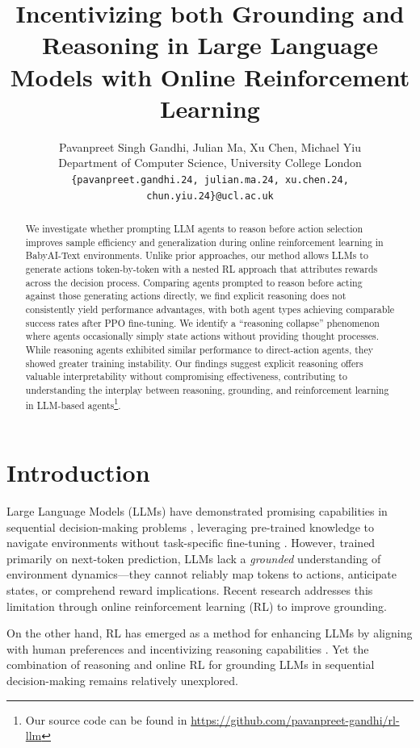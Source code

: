 \documentclass[11pt,a4paper]{article}
\title{Incentivizing both Grounding and Reasoning in Large Language Models with Online Reinforcement Learning}
\author{
  Pavanpreet Singh Gandhi, Julian Ma, Xu Chen, Michael Yiu \\
  Department of Computer Science, University College London \\
  \texttt{\{pavanpreet.gandhi.24, julian.ma.24, xu.chen.24, chun.yiu.24\}@ucl.ac.uk}\\ 
}
\date{}
\begin{document}
\thispagestyle{plain}
\pagestyle{plain}
\maketitle
\begin{abstract}
    We investigate whether prompting LLM agents to reason before action selection 
    improves sample efficiency and generalization during online reinforcement learning in BabyAI-Text environments. 
    Unlike prior approaches, our method allows LLMs to generate actions token-by-token with a nested RL approach that attributes rewards 
    across the decision process. 
    Comparing agents prompted to reason before acting against those generating actions directly, 
    we find explicit reasoning does not consistently yield performance advantages, 
    with both agent types achieving comparable success rates after PPO fine-tuning. 
    We identify a ``reasoning collapse'' phenomenon where agents occasionally simply state actions without providing thought processes. 
    While reasoning agents exhibited similar performance to direct-action agents, they showed greater training instability. 
    Our findings suggest explicit reasoning offers valuable interpretability without compromising effectiveness, 
    contributing to understanding the interplay between reasoning, grounding, and reinforcement learning in LLM-based agents\footnote{Our source code can be found in \url{https://github.com/pavanpreet-gandhi/rl-llm}}.
\end{abstract}

\section{Introduction}
Large Language Models (LLMs) have demonstrated promising capabilities in sequential decision-making problems \cite{yao2023treethoughtsdeliberateproblem, yao2023react}, leveraging pre-trained knowledge to navigate environments without task-specific fine-tuning \cite{wang2023voyager}. However, trained primarily on next-token prediction, LLMs lack a \textit{grounded} understanding of environment dynamics—they cannot reliably map tokens to actions, anticipate states, or comprehend reward implications. Recent research \cite{carta2023grounding} addresses this limitation through online reinforcement learning (RL) to improve grounding.

On the other hand, RL has emerged as a method for enhancing LLMs by aligning with human preferences \cite{ouyang2022training} and incentivizing reasoning capabilities \cite{deepseek2025r1, lambert2024t}. Yet the combination of reasoning and online RL for grounding LLMs in sequential decision-making remains relatively unexplored.
\end{document}

